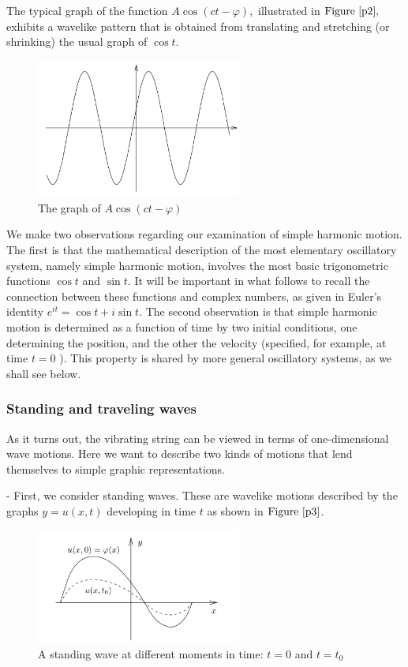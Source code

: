 \documentclass[12pt]{book}
\theoremstyle{definition}\newtheorem{dfn}{Définition}[chapter]
\theoremstyle{plain}\newtheorem{thm}{Théorème}[chapter]
\theoremstyle{plain}\newtheorem{prp}{Proposition}[chapter]
\theoremstyle{plain}\newtheorem{lem}{\bf Lemme}[chapter]
\theoremstyle{plain}\newtheorem{axm}{\bf Axiome}[chapter]
\theoremstyle{plain}\newtheorem{lmm}{\bf Lemme}[chapter]
\theoremstyle{plain}\newtheorem{exm}{\bf Example}[chapter]
\theoremstyle{plain}\newtheorem{cor}{\bf Corollaire}[chapter]
\theoremstyle{remark}\newtheorem{rem}{Remarque}[chapter]
\newcommand{\reffig}[1]{\text{Figure}\ \ref{#1}}
\begin{document}
The typical graph of the function $A \cos (c t-\varphi),$ illustrated in $\reffig{p2},$ exhibits a wavelike pattern that is obtained from translating and stretching (or shrinking) the usual graph of $\cos t$.
\begin{figure}[H]\centering\includegraphics[width=0.6\textwidth]{image//The Genesis of Fourier Analysis//2}
	\caption{The graph of $A \cos (c t-\varphi)$}
	\label{p2}	
\end{figure}
We make two observations regarding our examination of simple harmonic motion. The first is that the mathematical description of the most elementary oscillatory system, namely simple harmonic motion, involves the most basic trigonometric functions $\cos t$ and $\sin t .$ It will be important in what follows to recall the connection between these functions and complex numbers, as given in Euler's identity $e^{i t}=\cos t+i \sin t$. The second observation is that simple harmonic motion is determined as a function of time by two initial conditions, one determining the position, and the other the velocity (specified, for example, at time $t=0$ ). This property is shared by more general oscillatory systems, as we shall see below.

\subsubsection{Standing and traveling waves}
As it turns out, the vibrating string can be viewed in terms of one-dimensional wave motions. Here we want to describe two kinds of motions that lend themselves to simple graphic representations.

- First, we consider standing waves. These are wavelike motions described by the graphs $y=u(x, t)$ developing in time $t$ as shown in $\reffig{p3}$.
\begin{figure}[H]\centering\includegraphics[width=0.6\textwidth]{image//The Genesis of Fourier Analysis//3}
	\caption{A standing wave at different moments in time: $t=0$ and $t=t_{0}$}
	\label{p3}	
\end{figure}
\end{document}
